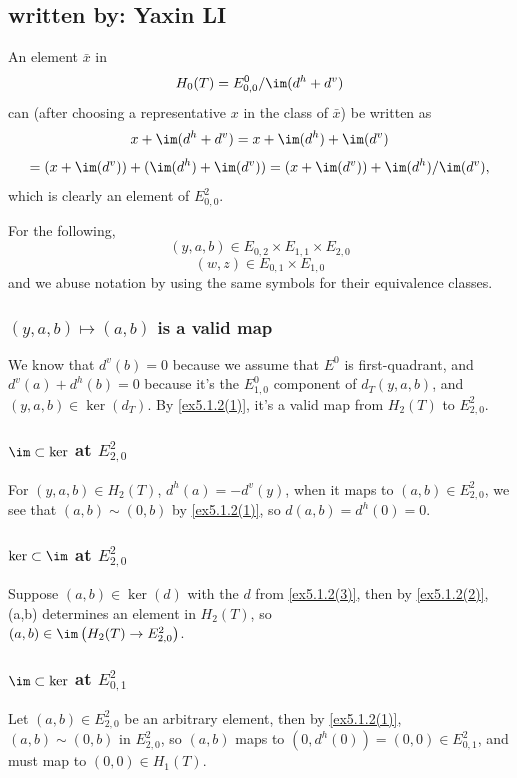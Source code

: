\subsection{written by: Yaxin LI}
An element $\bar x$ in
\[H_0(T)=E^0_{0,0}/\im(d^h+d^v)\]
can (after choosing a representative $x$ in the class of $\bar x$) be written as
\[x+\im(d^h+d^v)=x+\im(d^h)+\im(d^v)\]
\[=(x+\im(d^v))+(\im(d^h)+\im(d^v))=(x+\im(d^v))+\im(d^h)/\im(d^v),\]
which is clearly an element of $E^2_{0,0}$.

For the following,
\[(y,a,b)\in E_{0,2}\times E_{1,1}\times E_{2,0}\]
\[(w,z)\in E_{0,1}\times E_{1,0}\]
and we abuse notation by using the same symbols for their equivalence classes.
\subsubsection*{\texorpdfstring{$(y,a,b)\mapsto(a,b)$}{projection} \texorpdfstring{\textbf{is}}{is} \texorpdfstring{\textbf{a}}{a} \texorpdfstring{\textbf{valid}}{valid} \texorpdfstring{\textbf{map}}{map}}
We know that $d^v(b)=0$ because we assume that $E^0$ is first-quadrant, and $d^v(a)+d^h(b)=0$ because it's the $E^0_{1,0}$ component of $d_T(y,a,b)$, and $(y,a,b)\in\ker{(d_T)}$. By \ref{ex5.1.2(1)}, it's a valid map from $H_2(T)$ to $E^2_{2,0}$.
\subsubsection*{\texorpdfstring{$\im\subset\ker$}{im⊂ker} \texorpdfstring{\textbf{at}}{at} \texorpdfstring{$E^2_{2,0}$}{E²₂₀}}
For $(y,a,b)\in H_2(T)$, $d^h(a)=-d^v(y)$, when it maps to $(a,b)\in E^2_{2,0}$, we see that $(a,b)\sim(0,b)$ by \ref{ex5.1.2(1)}, so $d(a,b)=d^h(0)=0$.
\subsubsection*{\texorpdfstring{$\ker\subset\im$}{ker⊂im} \texorpdfstring{\textbf{at}}{at} \texorpdfstring{$E^2_{2,0}$}{E²₂₀}}
Suppose $(a,b)\in\ker{(d)}$ with the $d$ from \ref{ex5.1.2(3)}, then by \ref{ex5.1.2(2)}, (a,b) determines an element in $H_2(T)$, so\\
$(a,b)\in\im\left( H_2(T)\to E^2_{2,0} \right)$.
\subsubsection*{\texorpdfstring{$\im\subset\ker$}{im⊂ker} \texorpdfstring{\textbf{at}}{at} \texorpdfstring{$E^2_{0,1}$}{E²₀₁}}
Let $(a,b)\in E^2_{2,0}$ be an arbitrary element, then by \ref{ex5.1.2(1)}, $(a,b)\sim(0,b)$ in $E^2_{2,0}$, so $(a,b)$ maps to $(0,d^h(0))=(0,0)\in E^2_{0,1}$, and must map to $(0,0)\in H_1(T)$.
